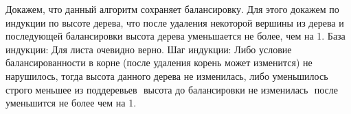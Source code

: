 \begin{frame}
    Докажем, что данный алгоритм сохраняет балансировку.
    Для этого докажем по индукции по высоте дерева,
    что после удаления некоторой вершины из дерева и
    последующей балансировки высота дерева уменьшается не более, чем на 1.
    База индукции: Для листа очевидно верно.
    Шаг индукции: Либо условие балансированности в корне (после удаления корень может изменится) не нарушилось,
    тогда высота данного дерева не изменилась,
    либо уменьшилось строго меньшее из поддеревьев $ $
    высота до балансировки не изменилась $ $
    после уменьшится не более чем на 1.
    
\end{frame}